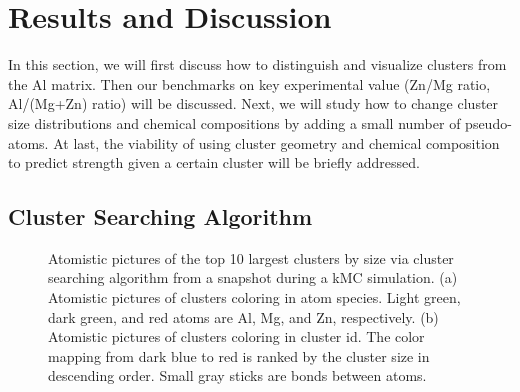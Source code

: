 \section{Results and Discussion}
\label{Chap:Al/Vac:section:RD}

In this section, we will first discuss how to distinguish and visualize clusters from the Al matrix. Then our benchmarks on key experimental value (Zn/Mg ratio, Al/(Mg+Zn) ratio) will be discussed. Next, we will study how to change cluster size distributions and chemical compositions by adding a small number of pseudo-atoms. At last, the viability of using cluster geometry and chemical composition to predict strength given a certain cluster will be briefly addressed.


\subsection{Cluster Searching Algorithm}

\begingroup
\begin{figure}[!ht]
  \centering
\caption[Atomistic pictures of the top 10 largest clusters by size via cluster searching algorithm.]{Atomistic pictures of the top 10 largest clusters by size via cluster searching algorithm from a snapshot during a \ac{kMC} simulation. (a) Atomistic pictures of clusters coloring in atom species. Light green, dark green, and red atoms are Al, Mg, and Zn, respectively. (b) Atomistic pictures of clusters coloring in cluster id. The color mapping from dark blue to red is ranked by the cluster size in descending order. Small gray sticks are bonds between atoms.}
\label{Chap:Al/Vac:fig:illu_cluster}
\end{figure}
\endgroup


